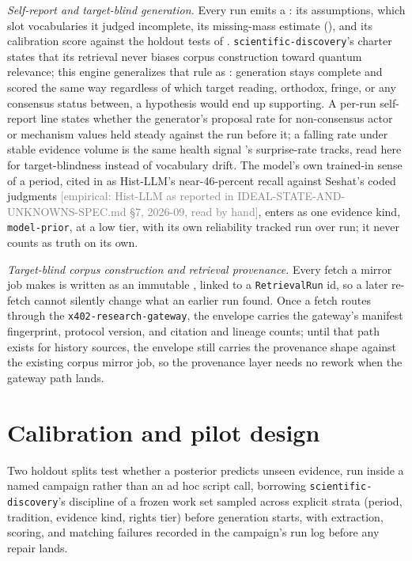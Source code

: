 \documentclass[11pt]{article}
\newcommand{\emp}[1]{\textcolor{gray}{\footnotesize [empirical: #1]}}
\begin{document}
\emph{Self-report and target-blind generation.} Every run emits a
: its assumptions, which slot vocabularies
it judged incomplete, its missing-mass estimate (), and its
calibration score against the holdout tests of .
\texttt{scientific-discovery}'s charter states that its retrieval never
biases corpus construction toward quantum relevance; this engine
generalizes that rule as :
generation stays complete and scored the same way regardless of which
target reading, orthodox, fringe, or any consensus status between, a
hypothesis would end up supporting. A per-run self-report line states
whether the generator's proposal rate for non-consensus actor or
mechanism values held steady against the run before it; a falling rate
under stable evidence volume is the same health signal
's surprise-rate tracks, read here for target-blindness
instead of vocabulary drift. The model's own trained-in sense of a
period, cited in  as Hist-LLM's near-46-percent recall
against Seshat's coded judgments \emp{Hist-LLM as reported in IDEAL-STATE-AND-UNKNOWNS-SPEC.md \S7, 2026-09, read by hand}, enters as one evidence kind,
\texttt{model-prior}, at a low tier, with its own reliability tracked run
over run; it never counts as truth on its own.

\emph{Target-blind corpus construction and retrieval provenance.} Every
fetch a mirror job makes is written as an immutable
, linked to a
\texttt{RetrievalRun} id, so a later re-fetch cannot silently change what
an earlier run found. Once a fetch routes through the
\texttt{x402-research-gateway}, the envelope carries the gateway's
manifest fingerprint, protocol version, and citation and lineage counts;
until that path exists for history sources, the envelope still carries
the provenance shape against the existing corpus mirror job, so the
provenance layer needs no rework when the gateway path lands.

\section{Calibration and pilot design}
\label{sec:calibration}

Two holdout splits test whether a posterior predicts unseen evidence, run
inside a named campaign rather than an ad hoc script call, borrowing
\texttt{scientific-discovery}'s discipline of a frozen work set sampled
across explicit strata (period, tradition, evidence kind, rights tier)
before generation starts, with extraction, scoring, and matching failures
recorded in the campaign's run log before any repair lands.
\end{document}
